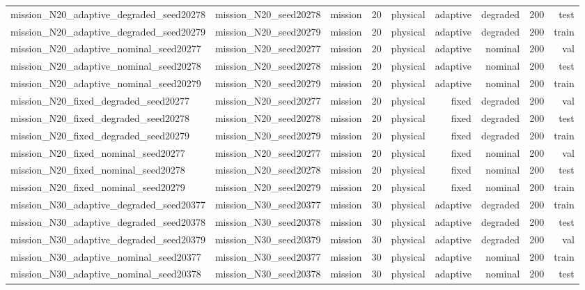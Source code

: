 \begin{tabular}{lrrrrrrrr}
mission\_N20\_adaptive\_degraded\_seed20278 & mission\_N20\_seed20278 & mission & 20 & physical & adaptive & degraded & 200 & test \\
mission\_N20\_adaptive\_degraded\_seed20279 & mission\_N20\_seed20279 & mission & 20 & physical & adaptive & degraded & 200 & train \\
mission\_N20\_adaptive\_nominal\_seed20277 & mission\_N20\_seed20277 & mission & 20 & physical & adaptive & nominal & 200 & val \\
mission\_N20\_adaptive\_nominal\_seed20278 & mission\_N20\_seed20278 & mission & 20 & physical & adaptive & nominal & 200 & test \\
mission\_N20\_adaptive\_nominal\_seed20279 & mission\_N20\_seed20279 & mission & 20 & physical & adaptive & nominal & 200 & train \\
mission\_N20\_fixed\_degraded\_seed20277 & mission\_N20\_seed20277 & mission & 20 & physical & fixed & degraded & 200 & val \\
mission\_N20\_fixed\_degraded\_seed20278 & mission\_N20\_seed20278 & mission & 20 & physical & fixed & degraded & 200 & test \\
mission\_N20\_fixed\_degraded\_seed20279 & mission\_N20\_seed20279 & mission & 20 & physical & fixed & degraded & 200 & train \\
mission\_N20\_fixed\_nominal\_seed20277 & mission\_N20\_seed20277 & mission & 20 & physical & fixed & nominal & 200 & val \\
mission\_N20\_fixed\_nominal\_seed20278 & mission\_N20\_seed20278 & mission & 20 & physical & fixed & nominal & 200 & test \\
mission\_N20\_fixed\_nominal\_seed20279 & mission\_N20\_seed20279 & mission & 20 & physical & fixed & nominal & 200 & train \\
mission\_N30\_adaptive\_degraded\_seed20377 & mission\_N30\_seed20377 & mission & 30 & physical & adaptive & degraded & 200 & train \\
mission\_N30\_adaptive\_degraded\_seed20378 & mission\_N30\_seed20378 & mission & 30 & physical & adaptive & degraded & 200 & test \\
mission\_N30\_adaptive\_degraded\_seed20379 & mission\_N30\_seed20379 & mission & 30 & physical & adaptive & degraded & 200 & val \\
mission\_N30\_adaptive\_nominal\_seed20377 & mission\_N30\_seed20377 & mission & 30 & physical & adaptive & nominal & 200 & train \\
mission\_N30\_adaptive\_nominal\_seed20378 & mission\_N30\_seed20378 & mission & 30 & physical & adaptive & nominal & 200 & test \\

\end{tabular}

